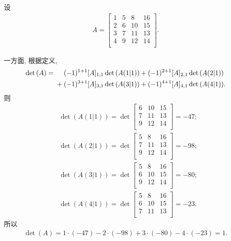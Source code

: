 \documentclass[../libro.tex]{subfiles}
\begin{document}
\begin{example}
    设
    \begin{align*}
        A =
        \begin{bmatrix}
            1 & 5 & 8  & 16 \\
            2 & 6 & 10 & 15 \\
            3 & 7 & 11 & 13 \\
            4 & 9 & 12 & 14 \\
        \end{bmatrix}.
    \end{align*}

    一方面,
    根据定义,
    \begin{align*}
        \det {(A)}
        = {} &
        \hphantom{{} + {}}
        (-1)^{1+1} [A]_{1,1} \det {(A(1|1))}
        + (-1)^{2+1} [A]_{2,1} \det {(A(2|1))}
        \\
        &
        + (-1)^{3+1} [A]_{3,1} \det {(A(3|1))}
        + (-1)^{4+1} [A]_{4,1} \det {(A(4|1))}.
    \end{align*}
    则
    \begin{align*}
        & \det {(A(1|1))}
        = \det {
            \begin{bmatrix}
                6 & 10 & 15 \\
                7 & 11 & 13 \\
                9 & 12 & 14 \\
        \end{bmatrix}}
        = -47;             \\
        & \det {(A(2|1))}
        = \det {
            \begin{bmatrix}
                5 & 8  & 16 \\
                7 & 11 & 13 \\
                9 & 12 & 14 \\
        \end{bmatrix}}
        = -98;             \\
        & \det {(A(3|1))}
        = \det {
            \begin{bmatrix}
                5 & 8  & 16 \\
                6 & 10 & 15 \\
                9 & 12 & 14 \\
        \end{bmatrix}}
        = -80;             \\
        & \det {(A(4|1))}
        = \det {
            \begin{bmatrix}
                5 & 8  & 16 \\
                6 & 10 & 15 \\
                7 & 11 & 13 \\
        \end{bmatrix}}
        = -23.
    \end{align*}
    所以
    \begin{align*}
        \det {(A)}
        = 1 \cdot (-47) - 2 \cdot (-98)
        + 3 \cdot (-80) - 4 \cdot (-23)
        = 1.
    \end{align*}


\end{example}
\end{document}
